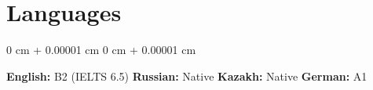 \documentclass[10pt, letterpaper]{article}
\newenvironment{onecolentry}{
    \begin{adjustwidth}{
        0 cm + 0.00001 cm
    }{
        0 cm + 0.00001 cm
    }
}{
    \end{adjustwidth}
} %
\begin{document}
\section{Languages}

\begin{onecolentry}
    \textbf{English:} B2 (IELTS 6.5) \hspace{1em}
    \textbf{Russian:} Native \hspace{1em}
    \textbf{Kazakh:} Native \hspace{1em}
    \textbf{German:} A1
\end{onecolentry}
\end{document}
